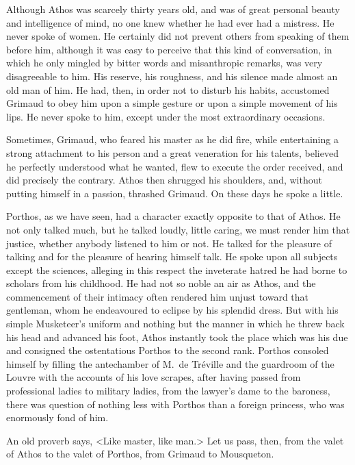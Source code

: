 Although Athos was scarcely thirty years old, and was of great personal beauty and intelligence of mind, no one knew whether he had ever had a mistress. He never spoke of women. He certainly did not prevent others from speaking of them before him, although it was easy to perceive that this kind of conversation, in which he only mingled by bitter words and misanthropic remarks, was very disagreeable to him. His reserve, his roughness, and his silence made almost an old man of him. He had, then, in order not to disturb his habits, accustomed Grimaud to obey him upon a simple gesture or upon a simple movement of his lips. He never spoke to him, except under the most extraordinary occasions. 

Sometimes, Grimaud, who feared his master as he did fire, while entertaining a strong attachment to his person and a great veneration for his talents, believed he perfectly understood what he wanted, flew to execute the order received, and did precisely the contrary. Athos then shrugged his shoulders, and, without putting himself in a passion, thrashed Grimaud. On these days he spoke a little. 

Porthos, as we have seen, had a character exactly opposite to that of Athos. He not only talked much, but he talked loudly, little caring, we must render him that justice, whether anybody listened to him or not. He talked for the pleasure of talking and for the pleasure of hearing himself talk. He spoke upon all subjects except the sciences, alleging in this respect the inveterate hatred he had borne to scholars from his childhood. He had not so noble an air as Athos, and the commencement of their intimacy often rendered him unjust toward that gentleman, whom he endeavoured to eclipse by his splendid dress. But with his simple Musketeer's uniform and nothing but the manner in which he threw back his head and advanced his foot, Athos instantly took the place which was his due and consigned the ostentatious Porthos to the second rank. Porthos consoled himself by filling the antechamber of M.~de Tréville and the guardroom of the Louvre with the accounts of his love scrapes, after having passed from professional ladies to military ladies, from the lawyer's dame to the baroness, there was question of nothing less with Porthos than a foreign princess, who was enormously fond of him. 

An old proverb says, <Like master, like man.> Let us pass, then, from the valet of Athos to the valet of Porthos, from Grimaud to Mousqueton. 

